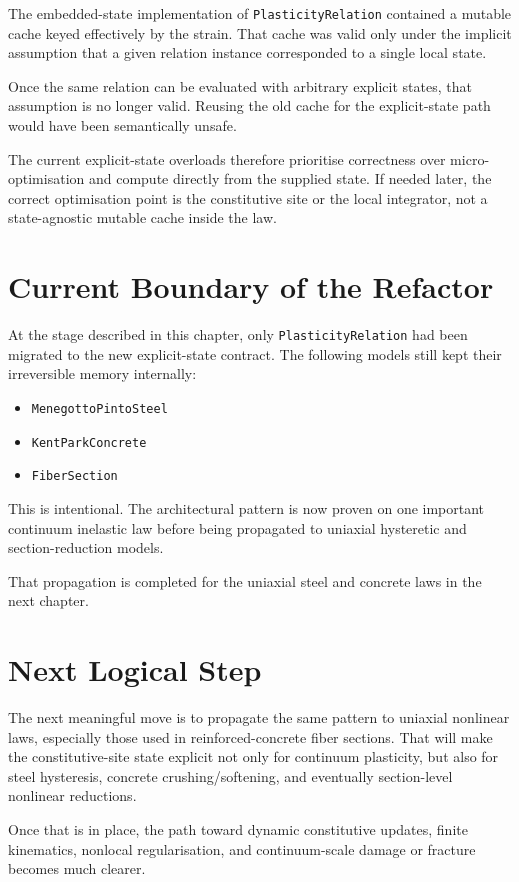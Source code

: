 The embedded-state implementation of \texttt{PlasticityRelation} contained a
mutable cache keyed effectively by the strain.  That cache was valid only under
the implicit assumption that a given relation instance corresponded to a single
local state.

Once the same relation can be evaluated with arbitrary explicit states, that
assumption is no longer valid.  Reusing the old cache for the explicit-state
path would have been semantically unsafe.

The current explicit-state overloads therefore prioritise correctness over
micro-optimisation and compute directly from the supplied state.  If needed
later, the correct optimisation point is the constitutive site or the local
integrator, not a state-agnostic mutable cache inside the law.

\section{Current Boundary of the Refactor}

At the stage described in this chapter, only \texttt{PlasticityRelation} had
been migrated to the new explicit-state contract.  The following models still
kept their irreversible memory internally:

\begin{itemize}
  \item \texttt{MenegottoPintoSteel}
  \item \texttt{KentParkConcrete}
  \item \texttt{FiberSection}
\end{itemize}

This is intentional.  The architectural pattern is now proven on one important
continuum inelastic law before being propagated to uniaxial hysteretic and
section-reduction models.

That propagation is completed for the uniaxial steel and concrete laws in the
next chapter.

\section{Next Logical Step}

The next meaningful move is to propagate the same pattern to uniaxial
nonlinear laws, especially those used in reinforced-concrete fiber sections.
That will make the constitutive-site state explicit not only for continuum
plasticity, but also for steel hysteresis, concrete crushing/softening, and
eventually section-level nonlinear reductions.

Once that is in place, the path toward dynamic constitutive updates, finite
kinematics, nonlocal regularisation, and continuum-scale damage or fracture
becomes much clearer.
